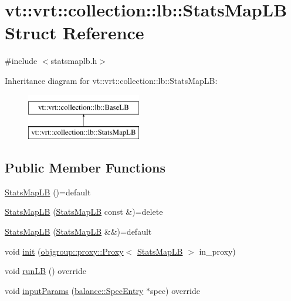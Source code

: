 \hypertarget{structvt_1_1vrt_1_1collection_1_1lb_1_1_stats_map_l_b}{}\section{vt\+:\+:vrt\+:\+:collection\+:\+:lb\+:\+:Stats\+Map\+LB Struct Reference}
\label{structvt_1_1vrt_1_1collection_1_1lb_1_1_stats_map_l_b}


{\ttfamily \#include $<$statsmaplb.\+h$>$}

Inheritance diagram for vt\+:\+:vrt\+:\+:collection\+:\+:lb\+:\+:Stats\+Map\+LB\+:\begin{figure}[H]
\begin{center}
\leavevmode
\includegraphics[height=2.000000cm]{structvt_1_1vrt_1_1collection_1_1lb_1_1_stats_map_l_b}
\end{center}
\end{figure}
\subsection*{Public Member Functions}
\begin{DoxyCompactItemize}
\item 
\hyperlink{structvt_1_1vrt_1_1collection_1_1lb_1_1_stats_map_l_b_ae854ea50c2de3fadee41292343301b6d}{Stats\+Map\+LB} ()=default
\item 
\hyperlink{structvt_1_1vrt_1_1collection_1_1lb_1_1_stats_map_l_b_aff22302292a842b662d35393182340a8}{Stats\+Map\+LB} (\hyperlink{structvt_1_1vrt_1_1collection_1_1lb_1_1_stats_map_l_b}{Stats\+Map\+LB} const \&)=delete
\item 
\hyperlink{structvt_1_1vrt_1_1collection_1_1lb_1_1_stats_map_l_b_af7184574df8d8b3ce4992a69c23c23cb}{Stats\+Map\+LB} (\hyperlink{structvt_1_1vrt_1_1collection_1_1lb_1_1_stats_map_l_b}{Stats\+Map\+LB} \&\&)=default
\item 
void \hyperlink{structvt_1_1vrt_1_1collection_1_1lb_1_1_stats_map_l_b_a5af7ebfa026d3b236fee88bc2b5d139e}{init} (\hyperlink{structvt_1_1objgroup_1_1proxy_1_1_proxy}{objgroup\+::proxy\+::\+Proxy}$<$ \hyperlink{structvt_1_1vrt_1_1collection_1_1lb_1_1_stats_map_l_b}{Stats\+Map\+LB} $>$ in\+\_\+proxy)
\item 
void \hyperlink{structvt_1_1vrt_1_1collection_1_1lb_1_1_stats_map_l_b_a20a7bd354dcaca4393c66034be3b4083}{run\+LB} () override
\item 
void \hyperlink{structvt_1_1vrt_1_1collection_1_1lb_1_1_stats_map_l_b_a495d91782f11c1bb5d1774a05b2a73f6}{input\+Params} (\hyperlink{structvt_1_1vrt_1_1collection_1_1balance_1_1_spec_entry}{balance\+::\+Spec\+Entry} $\ast$spec) override
\end{DoxyCompactItemize}
